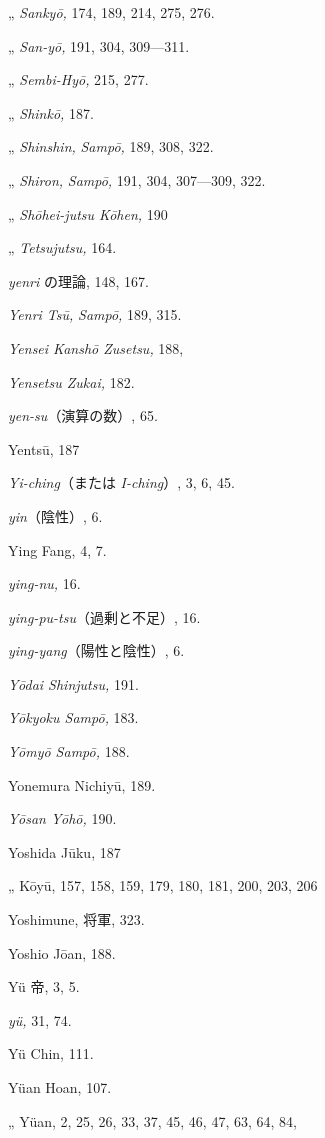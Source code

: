 \documentclass[11pt]{article}
\begin{document}
\quad „ \emph{Sankyō,} 174, 189, 214, 275, 276.\par
\quad „ \emph{San-yō,} 191, 304, 309---311.\par
\quad „ \emph{Sembi-Hyō,} 215, 277.\par
\quad „ \emph{Shinkō,} 187.\par
\quad „ \emph{Shinshin,} \emph{Sampō,} 189, 308, 322.\par
\quad „ \emph{Shiron,} \emph{Sampō,} 191, 304, 307---309, 322.\par
\quad „ \emph{Shōhei-jutsu Kōhen,} 190\par
\quad „ \emph{Tetsujutsu,} 164.\par
\emph{yenri} の理論, 148, 167.\par
\emph{Yenri Tsū,} \emph{Sampō,} 189, 315.\par
\emph{Yensei Kanshō Zusetsu,} 188,\par
\emph{Yensetsu Zukai,} 182.\par
\emph{yen-su}（演算の数）, 65.\par
Yentsū, 187\par
\emph{Yi-ching}（または \emph{I-ching}）, 3, 6, 45.\par
\emph{yin}（陰性）, 6.\par
Ying Fang, 4, 7.\par
\emph{ying-nu,} 16.\par
\emph{ying-pu-tsu}（過剰と不足）, 16.\par
\emph{ying-yang}（陽性と陰性）, 6.\par
\emph{Yōdai Shinjutsu,} 191.\par
\emph{Yōkyoku Sampō,} 183.\par
\emph{Yōmyō Sampō,} 188.\par
Yonemura Nichiyū, 189.\par
\emph{Yōsan Yōhō,} 190.\par
Yoshida Jūku, 187\par
\quad „ Kōyū, 157, 158, 159, 179, 180, 181, 200, 203, 206\par
Yoshimune, 将軍, 323.\par
Yoshio Jōan, 188.\par
Yü 帝, 3, 5.\par
\emph{yü,} 31, 74.\par
Yü Chin, 111.\par
Yüan Hoan, 107.\par
\quad „ Yüan, 2, 25, 26, 33, 37, 45, 46, 47, 63, 64, 84,
\end{document}
